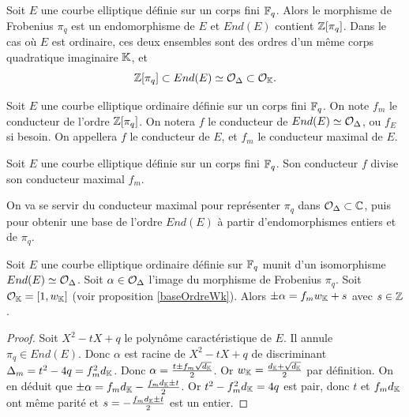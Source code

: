 Soit $E$ une courbe elliptique définie sur un corps fini $\mathbb{F}_{q}$. Alors le morphisme de Frobenius $\pi_{q}$ est un endomorphisme de $E$ et $End(E)$ contient $\mathbb{Z}[\pi_{q}]$. Dans le cas où $E$ est ordinaire, ces deux ensembles sont des ordres d'un même corps quadratique imaginaire $\mathbb{K}$, et
\begin{equation*}
	\mathbb{Z}[\pi_{q}]\subset End(E)\simeq\mathcal{O}_{\Delta}\subset\mathcal{O}_{\mathbb{K}}.
\end{equation*} 

\begin{Def}
	Soit $E$ une courbe elliptique ordinaire définie sur un corps fini $\mathbb{F}_{q}$. On note $f_{m}$ le conducteur de l'ordre $\mathbb{Z}[\pi_{q}]$. On notera $f$ le conducteur de $End(E)\simeq\mathcal{O}_{\Delta}$, ou $f_{E}$ si besoin. On appellera $f$ le conducteur de $E$, et $f_{m}$ le conducteur maximal de $E$. 
\end{Def}

\begin{Prop}
	Soit $E$ une courbe elliptique définie sur un corps fini $\mathbb{F}_{q}$. Son conducteur $f$ divise son conducteur maximal $f_{m}$.
\end{Prop}

On va se servir du conducteur maximal pour représenter $\pi_{q}$ dans $\mathcal{O}_{\Delta}\subset\mathbb{C}$, puis pour obtenir une base de l'ordre $End(E)$ à partir d'endomorphismes entiers et de $\pi_{q}$.

\begin{Prop}
	\label{lienEntierWkFq}
	Soit $E$ une courbe elliptique ordinaire définie sur $\mathbb{F}_{q}$ munit d'un isomorphisme $End(E)\simeq\mathcal{O}_{\Delta}$. Soit $\alpha\in\mathcal{O}_{\Delta}$ l'image du morphisme de Frobenius $\pi_{q}$. Soit $\mathcal{O}_{\mathbb{K}} = \left[ 1, w_{\mathbb{K}}\right] $ (voir proposition \ref{baseOrdreWk}). Alors $\pm\alpha = f_{m}w_{\mathbb{K}} + s$ avec $s\in\mathbb{Z}$.
	
\end{Prop}

\begin{proof}
	Soit $X^{2} - tX + q$ le polynôme caractéristique de $E$. Il annule $\pi_{q}\in End(E)$. Donc $\alpha$ est racine de $X^{2} - tX + q$ de discriminant $\Delta_{m} = t^{2} - 4q = f_{m}^{2}d_{\mathbb{K}}$. Donc $\alpha = \frac{t\pm f_{m}\sqrt{d_{\mathbb{K}}}}{2}$. Or $w_{\mathbb{K}} = \frac{d_{\mathbb{K}} + \sqrt{d_{\mathbb{K}}}}{2}$ par définition. On en déduit que  $\pm\alpha = f_{m}d_{\mathbb{K}} - \frac{f_{m}d_{\mathbb{K}} \pm t}{2}$. Or $t^{2} - f_{m}^{2}d_{\mathbb{K}} = 4q$ est pair, donc $t$ et $f_{m}d_{\mathbb{K}}$ ont même parité et $s = -\frac{f_{m}d_{\mathbb{K}} \pm t}{2}$ est un entier.
	
\end{proof}

